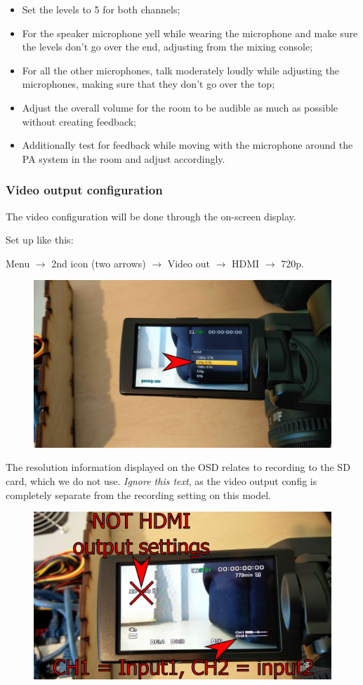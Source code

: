 \documentclass{article}
\begin{document}
\begin{itemize}
  \item Set the levels to 5 for both channels;
  \item For the speaker microphone yell while wearing the microphone and make sure the levels don't go over the end, adjusting from the mixing console;
  \item For all the other microphones, talk moderately loudly while adjusting the microphones, making sure that they don't go over the top;
  \item Adjust the overall volume for the room to be audible as much as possible without creating feedback;
  \item Additionally test for feedback while moving with the microphone around the PA system in the room and adjust accordingly.
\end{itemize}

\subsubsection{Video output configuration}
The video configuration will be done through the on-screen display.

Set up like this:

Menu $\rightarrow$ 2nd icon (two arrows) $\rightarrow$ Video out $\rightarrow$ HDMI $\rightarrow$ 720p.
\begin{figure}[H]
  \centering
\includegraphics[width = 120mm]{Sony05.jpg}
\end{figure}

The resolution information displayed on the OSD relates to recording to the SD card, which we do not use. \emph{Ignore this text}, as the video output config is completely separate from the recording setting on this model.
\begin{figure}[H]
  \centering
\includegraphics[width = 120mm]{Sony06.jpg}
\end{figure}
\end{document}
